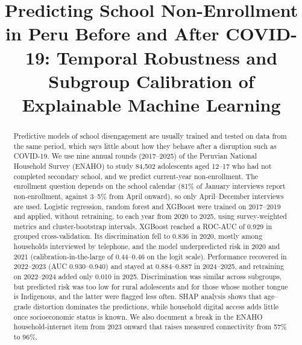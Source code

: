 \documentclass[conference]{IEEEtran}
\begin{document}
\title{Predicting School Non-Enrollment in Peru Before and After COVID-19: Temporal Robustness and Subgroup Calibration of Explainable Machine Learning}

\author{
}

\maketitle

\begin{abstract}
Predictive models of school disengagement are usually trained and tested on data from the same period, which says little about how they behave after a disruption such as COVID-19. We use nine annual rounds (2017--2025) of the Peruvian National Household Survey (ENAHO) to study 84,502 adolescents aged 12--17 who had not completed secondary school, and we predict current-year non-enrollment. The enrollment question depends on the school calendar (81\% of January interviews report non-enrollment, against 3--5\% from April onward), so only April--December interviews are used. Logistic regression, random forest and XGBoost were trained on 2017--2019 and applied, without retraining, to each year from 2020 to 2025, using survey-weighted metrics and cluster-bootstrap intervals. XGBoost reached a ROC-AUC of 0.929 in grouped cross-validation. Its discrimination fell to 0.836 in 2020, mostly among households interviewed by telephone, and the model underpredicted risk in 2020 and 2021 (calibration-in-the-large of 0.44--0.46 on the logit scale). Performance recovered in 2022--2023 (AUC 0.930--0.940) and stayed at 0.884--0.887 in 2024--2025, and retraining on 2022--2024 added only 0.010 in 2025. Discrimination was similar across subgroups, but predicted risk was too low for rural adolescents and for those whose mother tongue is Indigenous, and the latter were flagged less often. SHAP analysis shows that age--grade distortion dominates the predictions, while household digital access adds little once socioeconomic status is known. We also document a break in the ENAHO household-internet item from 2023 onward that raises measured connectivity from 57\% to 96\%.
\end{abstract}
\end{document}
